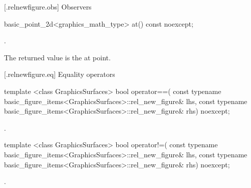  [\iotwod.relnewfigure.obs] {Observers}%

%
\begin{itemdecl}
basic_point_2d<graphics_math_type> at() const noexcept;
\end{itemdecl}
\begin{itemdescr}
\pnum
\returns {}.

\pnum
\remarks
The returned value is the at point.
\end{itemdescr}

 [\iotwod.relnewfigure.eq] {Equality operators}%

%
\begin{itemdecl}
template <class GraphicsSurfaces>
bool operator==(
  const typename basic_figure_items<GraphicsSurfaces>::rel_new_figure& lhs,
  const typename basic_figure_items<GraphicsSurfaces>::rel_new_figure& rhs)
  noexcept;
\end{itemdecl}
\begin{itemdescr}
\pnum
\returns {}.
\end{itemdescr}

%
\begin{itemdecl}
template <class GraphicsSurfaces>
bool operator!=(
  const typename basic_figure_items<GraphicsSurfaces>::rel_new_figure& lhs,
  const typename basic_figure_items<GraphicsSurfaces>::rel_new_figure& rhs) 
  noexcept;
\end{itemdecl}
\begin{itemdescr}
\pnum
\returns {}.
\end{itemdescr}
